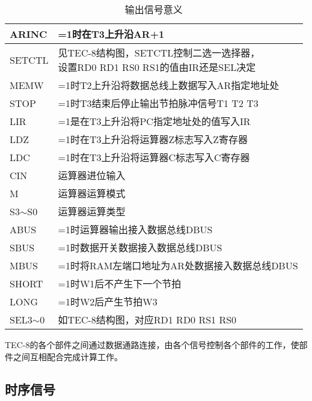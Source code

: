 \begin{table}[htbp]
{\begin{tabular}{|l|l|}
    ARINC       & =1时在T3上升沿AR+1                                          \\ \hline
    SETCTL      & \makecell[l] {见TEC-8结构图，SETCTL控制二选一选择器，\\设置RD0 RD1 RS0 RS1的值由IR还是SEL决定} \\ \hline
    MEMW        & =1时T2上升沿将数据总线上数据写入AR指定地址处                              \\ \hline
    STOP        & =1时T3结束后停止输出节拍脉冲信号T1 T2 T3                             \\ \hline
    LIR         & =1是在T3上升沿将PC指定地址处的值写入IR                                \\ \hline
    LDZ         & =1时在T3上升沿将运算器Z标志写入Z寄存器                                 \\ \hline
    LDC         & =1时在T3上升沿将运算器C标志写入C寄存器                                 \\ \hline
    CIN         & 运算器进位输入                                                \\ \hline
    M           & 运算器运算模式                                                \\ \hline
    S3$\sim$S0  & 运算器运算类型                                                \\ \hline
    ABUS        & =1时运算器输出接入数据总线DBUS                                     \\ \hline
    SBUS        & =1时数据开关数据接入数据总线DBUS                                    \\ \hline
    MBUS        & =1时将RAM左端口地址为AR处数据接入数据总线DBUS                           \\ \hline
    SHORT       & =1时W1后不产生下一个节拍                                         \\ \hline
    LONG        & =1时W2后产生节拍W3                                           \\ \hline
    SEL3$\sim$0 & 如TEC-8结构图，对应RD1 RD0 RS1 RS0                            \\ \hline
    \end{tabular}}
    \caption{输出信号意义}

\end{table}

TEC-8的各个部件之间通过数据通路连接，由各个信号控制各个部件的工作，使部件之间互相配合完成计算工作。

\clearpage
\subsection{时序信号}


